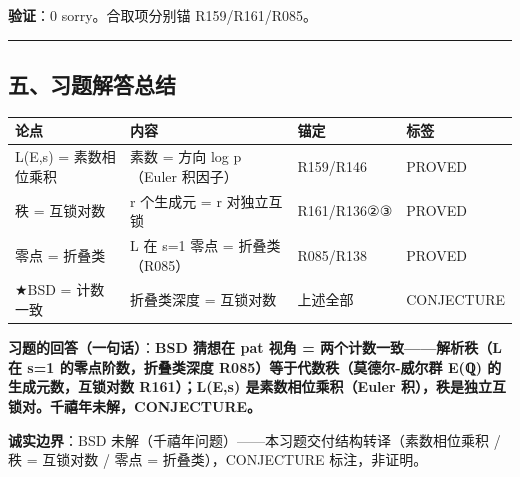 \documentclass[
]{article}
\newcounter{none} %
\begin{document}
\textbf{验证}：0 sorry。合取项分别锚 R159/R161/R085。

\begin{center}\rule{0.5\linewidth}{0.5pt}\end{center}

\subsection{五、习题解答总结}\label{ux4e94ux4e60ux9898ux89e3ux7b54ux603bux7ed3}

{\def\LTcaptype{none} %
\begin{longtable}[]{@{}
  >{\raggedright\arraybackslash}p{}
  >{\raggedright\arraybackslash}p{}
  >{\raggedright\arraybackslash}p{}
  >{\raggedright\arraybackslash}p{}@{}}
\toprule\noalign{}
\begin{minipage}[b]{\linewidth}\raggedright
论点
\end{minipage} & \begin{minipage}[b]{\linewidth}\raggedright
内容
\end{minipage} & \begin{minipage}[b]{\linewidth}\raggedright
锚定
\end{minipage} & \begin{minipage}[b]{\linewidth}\raggedright
标签
\end{minipage} \\
\midrule\noalign{}
\endhead
\bottomrule\noalign{}
\endlastfoot
L(E,s) = 素数相位乘积 & 素数 = 方向 log p（Euler 积因子） & R159/R146 &
PROVED \\
秩 = 互锁对数 & r 个生成元 = r 对独立互锁 & R161/R136②③ & PROVED \\
零点 = 折叠类 & L 在 s=1 零点 = 折叠类（R085） & R085/R138 & PROVED \\
★BSD = 计数一致 & 折叠类深度 = 互锁对数 & 上述全部 & CONJECTURE \\
\end{longtable}
}

\textbf{习题的回答（一句话）}：\textbf{BSD 猜想在 pat 视角 =
两个计数一致------解析秩（L 在 s=1 的零点阶数，折叠类深度
R085）等于代数秩（莫德尔-威尔群 E(ℚ) 的生成元数，互锁对数 R161）；L(E,s)
是素数相位乘积（Euler 积），秩是独立互锁对。千禧年未解，CONJECTURE。}

\textbf{诚实边界}：BSD
未解（千禧年问题）------本习题交付结构转译（素数相位乘积 / 秩 = 互锁对数
/ 零点 = 折叠类），CONJECTURE 标注，非证明。
\end{document}
